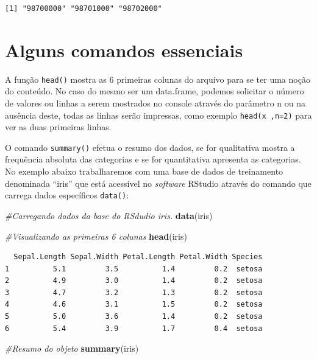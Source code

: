 \documentclass[12pt,brazil,]{book}
\newenvironment{Shaded}{\begin{snugshade}}{\end{snugshade}}
\newcommand{\CommentTok}[1]{\textcolor[rgb]{0.56,0.35,0.01}{\textit{#1}}}
\newcommand{\KeywordTok}[1]{\textcolor[rgb]{0.13,0.29,0.53}{\textbf{#1}}}
\newcommand{\NormalTok}[1]{#1}
\begin{document}
\begin{verbatim}
[1] "98700000" "98701000" "98702000"
\end{verbatim}

\hypertarget{alguns-comandos-essenciais}{%
\section{Alguns comandos essenciais}\label{alguns-comandos-essenciais}}

A função \texttt{head()} mostra as 6 primeiras colunas do arquivo para
se ter uma noção do conteúdo. No caso do mesmo ser um data.frame,
podemos solicitar o número de valores ou linhas a serem mostrados no
console através do parâmetro n ou na ausência deste, todas as linhas
serão impressas, como exemplo \texttt{head(x\ ,n=2)} para ver as duas
primeiras linhas.

O comando \texttt{summary()} efetua o resumo dos dados, se for
qualitativa mostra a frequência absoluta das categorias e se for
quantitativa apresenta as categorias. No exemplo abaixo trabalharemos
com uma base de dados de treinamento denominada ``iris'' que está
acessível no \emph{software} RStudio através do comando que carrega
dados específicos \texttt{data()}:

\begin{Shaded}
\begin{Highlighting}[]
\CommentTok{#Carregando dados da base do RSdudio iris.}
\KeywordTok{data}\NormalTok{(iris)}

\CommentTok{#Visualizando as primeiras 6 colunas}
\KeywordTok{head}\NormalTok{(iris)}
\end{Highlighting}
\end{Shaded}

\begin{verbatim}
  Sepal.Length Sepal.Width Petal.Length Petal.Width Species
1          5.1         3.5          1.4         0.2  setosa
2          4.9         3.0          1.4         0.2  setosa
3          4.7         3.2          1.3         0.2  setosa
4          4.6         3.1          1.5         0.2  setosa
5          5.0         3.6          1.4         0.2  setosa
6          5.4         3.9          1.7         0.4  setosa
\end{verbatim}

\begin{Shaded}
\begin{Highlighting}[]
\CommentTok{#Resumo do objeto}
\KeywordTok{summary}\NormalTok{(iris)}
\end{Highlighting}
\end{Shaded}
\end{document}

